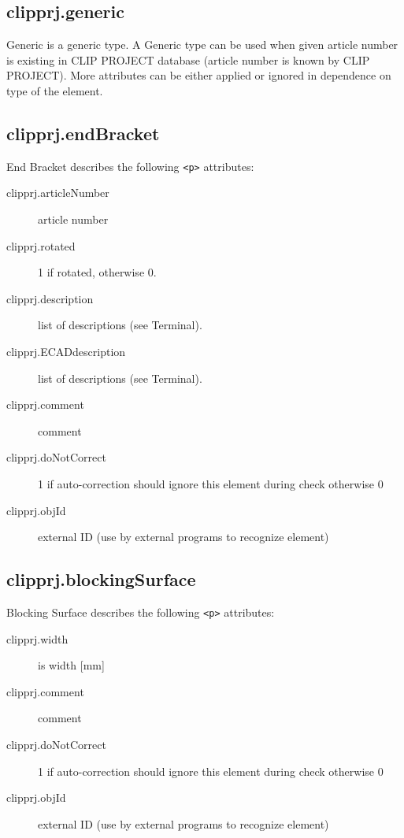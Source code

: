 \documentclass[%
	a4paper,
	oneside,
	listof=numbered,
	parskip=half,
	headsepline=true,
	footsepline=false,
	normalheadings,
	0.7headlines,
	headexclude,
	]{scrbook}
\begin{document}
\subsection{clipprj.generic}
 
Generic is a generic type.
A Generic type can be used when given article number is existing in CLIP PROJECT database (article number is known by CLIP PROJECT).
More attributes can be either applied or ignored in dependence on type of the element.

\subsection{clipprj.endBracket}
 
End Bracket describes the following \verb|<p>| attributes: 

\begin{description}
	\item[clipprj.articleNumber] article number 
	\item[clipprj.rotated] 1 if rotated, otherwise 0. 
	\item[clipprj.description] list of descriptions (see Terminal). 
	\item[clipprj.ECADdescription] list of descriptions (see Terminal). 
	\item[clipprj.comment] comment 
	\item[clipprj.doNotCorrect] 1 if auto-correction should ignore this element during check otherwise 0 
	\item[clipprj.objId] external ID (use by external programs to recognize element) 
\end{description}

\subsection{clipprj.blockingSurface}
 
Blocking Surface describes the following \verb|<p>| attributes: 

\begin{description}
	\item[clipprj.width] is width [mm] 
	\item[clipprj.comment] comment 
	\item[clipprj.doNotCorrect] 1 if auto-correction should ignore this element during check otherwise 0 
	\item[clipprj.objId] external ID (use by external programs to recognize element) 
\end{description}
\end{document}
